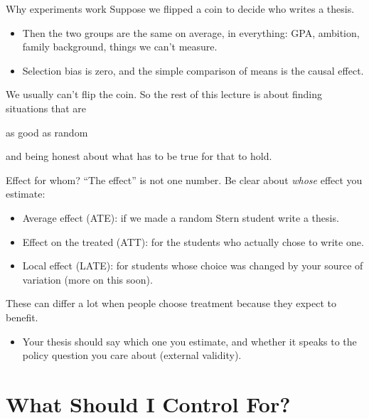 \documentclass[aspectratio=169,11pt]{beamer}
\begin{document}
\begin{frame}{Why experiments work}
Suppose we \alert{flipped a coin} to decide who writes a thesis.
\begin{itemize}
	\item Then the two groups are the same on average, in everything: GPA, ambition, family background, things we can't measure.
	\item Selection bias is zero, and the simple comparison of means \alert{is} the causal effect.
\end{itemize}
\bigskip
We usually can't flip the coin. So the rest of this lecture is about finding situations that are
\begin{center}
\alert{as good as random}
\end{center}
and being honest about what has to be true for that to hold.
\end{frame}


\begin{frame}{Effect for whom?}
``The effect'' is not one number. Be clear about \emph{whose} effect you estimate:
\begin{itemize}
	\item \alert{Average effect (ATE)}: if we made a random Stern student write a thesis.
	\item \alert{Effect on the treated (ATT)}: for the students who actually chose to write one.
	\item \alert{Local effect (LATE)}: for students whose choice was changed by your source of variation (more on this soon).
\end{itemize}
\medskip
These can differ a lot when people \alert{choose} treatment because they expect to benefit.
\medskip
\begin{itemize}
	\item Your thesis should say which one you estimate, and whether it speaks to the policy question you care about (\alert{external validity}).
\end{itemize}
\end{frame}


\section{What Should I Control For?}
\end{document}

